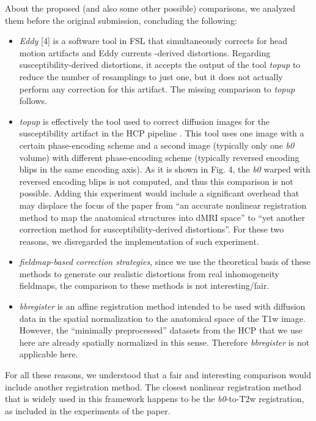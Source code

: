 \documentclass[9pt]{memoir}
\begin{document}
{About the proposed (and also some other possible) comparisons, we analyzed them before
  the original submission, concluding the following:
\begin{itemize}
\item \emph{Eddy} [4] is a software tool in FSL that simultaneously corrects for
    head motion artifacts and Eddy currents -derived distortions.
  Regarding susceptibility-derived distortions, it accepts the output of the tool 
    \emph{topup} to reduce the number of resamplings to just one, but it does not
    actually perform any correction for this artifact.
  The missing comparison to \emph{topup} follows.
\item \emph{topup} is effectively the tool used to correct diffusion images for the
  susceptibility artifact in the HCP pipeline \citep{glasser_minimal_2013}.
  This tool uses one image with a certain phase-encoding scheme and a second image
    (typically only one \emph{b0} volume) with different phase-encoding scheme (typically
    reversed encoding blips in the same encoding axis).
  As it is shown in Fig. 4, the \emph{b0} warped with reversed encoding blips is not
    computed, and thus this comparison is not possible.
  Adding this experiment would include a significant overhead that may displace the focus
    of the paper from ``an accurate nonlinear registration method to map the anatomical
    structures into dMRI space'' to ``yet another correction method for susceptibility-derived
    distortions''.
  For these two reasons, we disregarded the implementation of such experiment.
\item \emph{fieldmap-based correction strategies}, since we use the theoretical basis of these
  methods to generate our realistic distortions from real inhomogeneity fieldmaps, 
  the comparison to these methods is not interesting/fair.
\item \emph{bbregister} is an affine registration method intended to be used with diffusion
  data in the spatial normalization to the anatomical space of the T1w image.
  However, the ``minimally preprocessed'' datasets from the HCP that we use here are already
  spatially normalized in this sense.
  Therefore \emph{bbregister} is not applicable here.
\end{itemize}
For all these reasons, we understood that a fair and interesting comparison would include
  another registration method.
The closest nonlinear registration method that is widely used in this framework happens
  to be the \emph{b0}-to-T2w registration, as included in the experiments of the paper.
}
\end{document}
